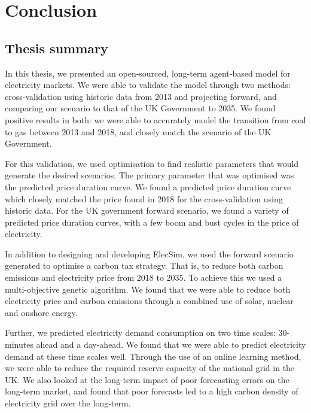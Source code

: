 \chapter{Conclusion}
\label{chapter:conclusion}
\ifpdf
    \graphicspath{{Chapter3/Figs/Raster/}{Chapter3/Figs/PDF/}{Chapter3/Figs/}}
\else
    \graphicspath{{Chapter3/Figs/Vector/}{Chapter3/Figs/}}
\fi


\section{Thesis summary}

In this thesis, we presented an open-sourced, long-term agent-based model for electricity markets. We were able to validate the model through two methods: cross-validation using historic data from 2013 and projecting forward, and comparing our scenario to that of the UK Government to 2035. We found positive results in both: we were able to accurately model the transition from coal to gas between 2013 and 2018, and closely match the scenario of the UK Government. 

For this validation, we used optimisation to find realistic parameters that would generate the desired scenarios. The primary parameter that was optimised was the predicted price duration curve. We found a predicted price duration curve which closely matched the price found in 2018 for the cross-validation using historic data. For the UK government forward scenario, we found a variety of predicted price duration curves, with a few boom and bust cycles in the price of electricity. 

In addition to designing and developing ElecSim, we used the forward scenario generated to optimise a carbon tax strategy. That is, to reduce both carbon emissions and electricity price from 2018 to 2035. To achieve this we used a multi-objective genetic algorithm. We found that we were able to reduce both electricity price and carbon emissions through a combined use of solar, nuclear and onshore energy.

Further, we predicted electricity demand consumption on two time scales: 30-minutes ahead and a day-ahead. We found that we were able to predict electricity demand at these time scales well. Through the use of an online learning method, we were able to reduce the required reserve capacity of the national grid in the UK. We also looked at the long-term impact of poor forecasting errors on the long-term market, and found that poor forecasts led to a high carbon density of electricity grid over the long-term.

